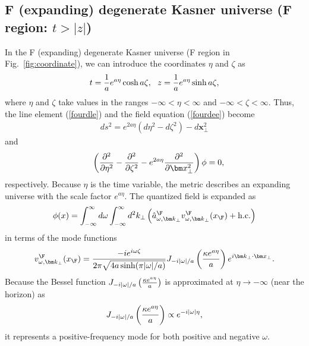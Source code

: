 \documentclass[aps,prd,preprintnumbers,nofootinbib,showpacs]{revtex4}%
\begin{document}
\begin{widetext}
\subsection{F (expanding) degenerate Kasner universe (F region: $t>|z|$)}
In the F (expanding) degenerate Kasner universe
(F region in Fig.~\ref{fig:coordinate}), 
we can introduce the coordinates $\eta$ and $\zeta$ as
\begin{eqnarray}
t={1\over a}e^{a\eta}\cosh a\zeta,~~
z={1\over a}e^{a\eta}\sinh a\zeta,
\end{eqnarray}
where $\eta$ and $\zeta$ take values in the ranges $-\infty<\eta<\infty$ and 
$-\infty<\zeta<\infty$. Thus, the line element (\ref{fourdle}) and
the field equation (\ref{fourdee}) become
\begin{eqnarray}
ds^2=e^{2a\eta}(d\eta^2-d\zeta^2)-d\bm x_\perp^2
\end{eqnarray}
and
\begin{eqnarray}
&&\left({\partial^2\over \partial \eta^2}-{\partial^2\over \partial \zeta^2}
-e^{2a\eta}{\partial^2\over \partial \bm x_\perp^2}\right)\phi=0,
\label{fourdeF}
\end{eqnarray}
respectively. Because $\eta$ is the time variable, the metric describes an expanding universe with the 
scale factor $e^{a \eta}$.
 The quantized field is expanded as 
\begin{eqnarray}
\phi(x)=\int_{-\infty}^{\infty} 
d \omega\int_{-\infty}^{\infty} d^2k_\perp \left( {\hat a}_{\omega,{\bm k}_\perp}^\F v_{\omega,{\bm k}_\perp}^\F(x_\F)
+{\rm h.c.}
\right)
\label{qfF}
\end{eqnarray}
in terms of the mode functions 
\begin{eqnarray}
v_{\omega,{\bm k}_\perp}^\F(x_\F)={-ie^{i\omega\zeta}\over 2\pi\sqrt{4a\sinh (\pi |\omega|/a)}}
J_{-i|\omega|/a}\left({\kappa e^{a\eta}\over a}\right)
e^{i\bm k_\perp\cdot \bm x_\perp}.
\label{qfRR}
\end{eqnarray}
Because the Bessel function $J_{-i|\omega|/a}\left({\kappa e^{a\eta}\over a}\right)$ 
is approximated at $\eta \rightarrow -\infty$ (near the horizon) as
\begin{eqnarray}
J_{-i|\omega|/a}\left({\kappa e^{a\eta}\over a}\right) 
\propto  e^{-i |\omega| \eta},
\end{eqnarray}
it represents a positive-frequency mode for both positive and negative $\omega$.

\end{widetext}
\end{document}
